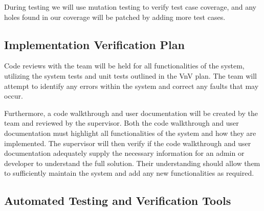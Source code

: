 \documentclass[12pt, titlepage]{article}
\begin{document}
During testing we will use mutation testing to verify test case coverage, and
any holes found in our coverage will be patched by adding more test cases.

\subsection{Implementation Verification Plan}




Code reviews with the team will be held for all functionalities of the system, utilizing the
system tests and unit tests outlined in the VnV plan. The team will attempt to identify any
errors within the system and correct any faults that may occur.

Furthermore, a code walkthrough and user documentation will be created by the team and
reviewed by the supervisor. Both the code walkthrough and user documentation must highlight
all functionalities of the system and how they are implemented. The supervisor will then
verify if the code walkthrough and user documentation adequately supply the necessary
information for an admin or developer to understand the full solution. Their understanding
should allow them to sufficiently maintain the system and add any new functionalities as
required.

\subsection{Automated Testing and Verification Tools}

\end{document}
